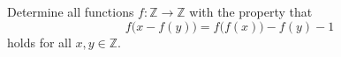 Determine all functions $f \colon \mathbb{Z} \to \mathbb{Z}$ with the property that
\[
f\bigl(x - f(y)\bigr) = f\bigl(f(x)\bigr) - f(y) - 1
\]
holds for all $x, y \in \mathbb{Z}$.
